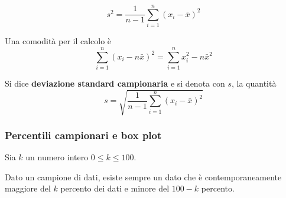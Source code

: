 \documentclass{article}
\begin{document}
    \begin{equation*}
        s^2 = \frac{1}{n-1} \sum_{i=1}^{n} (x_i - \bar{x})^2
    \end{equation*}

    Una comodità per il calcolo è
    \begin{equation*}
        \sum_{i=1}^{n} (x_i - n\bar{x})^2 = \sum_{i=1}^{n} x_i^2 - n\bar{x}^2
    \end{equation*}

    Si dice \textbf{deviazione standard campionaria} e si denota  con $s$, la quantità
    \begin{equation*}
        s = \sqrt{\frac{1}{n-1} \sum_{i=1}^{n} (x_i - \bar{x})^2}
    \end{equation*}



    \subsubsection{Percentili campionari e box plot}


    Sia $k$ un numero intero $0 \leq k \leq 100$.

    Dato un campione di dati, esiste sempre un dato che è contemporaneamente maggiore del $k$ percento dei dati e minore del $100-k$ percento.
\end{document}
